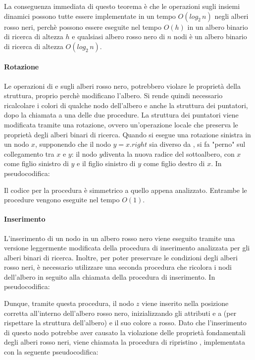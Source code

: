 \noindent La conseguenza immediata di questo teorema è che le operazioni sugli insiemi dinamici possono tutte essere implementate in un tempo \(O(log_2\,n)\) negli alberi rosso neri, perchè possono essere eseguite nel tempo  \(O(h)\) in un albero binario di ricerca di altezza \(h\) e qualsiasi albero rosso nero di \(n\) nodi è un albero binario di ricerca di altezza \(O(log_2\,n)\).

\paragraph{Rotazione}
Le operazioni di  e  sugli alberi rosso nero, potrebbero violare le proprietà della struttura, proprio perchè modificano l'albero. Si rende quindi necessario ricalcolare i colori di qualche nodo dell'albero e anche la struttura dei puntatori, dopo la chiamata a una delle due procedure. La struttura dei puntatori viene modificata tramite una rotazione, ovvero un'operazione locale che preserva le proprietà degli alberi binari di ricerca. Quando si esegue una rotazione sinistra in un nodo \(x\), supponendo che il nodo \(y = x.right\) sia diverso da , si fa "perno" sul collegamento tra \(x\) e \(y\): il nodo \(y\)diventa la nuova radice del sottoalbero, con \(x\) come figlio sinistro di \(y\) e il figlio sinistro di \(y\) come figlio destro di \(x\). In pseudocodifica:



Il codice per la procedura  è simmetrico a quello appena analizzato. Entrambe le procedure vengono eseguite nel tempo \(O(1)\).

\paragraph{Inserimento}
L'inserimento di un nodo in un albero rosso nero viene eseguito tramite una versione leggermente modificata della procedura di inserimento analizzata per gli alberi binari di ricerca. Inoltre, per poter preservare le condizioni degli alberi rosso neri, è necessario utilizzare una seconda procedura che ricolora i nodi dell'albero in seguito alla chiamata della procedura di inserimento. In pseudocodifica:



Dunque, tramite questa procedura, il nodo \(z\) viene inserito nella posizione corretta all'interno dell'albero rosso nero, inizializzando gli attributi  e a  (per rispettare la struttura dell'albero) e il suo colore a rosso. Dato che l'inserimento di questo nodo potrebbe aver causato la violazione delle proprietà fondamentali degli alberi rosso neri, viene chiamata la procedura di ripristino , implementata con la seguente pseudocodifica:


